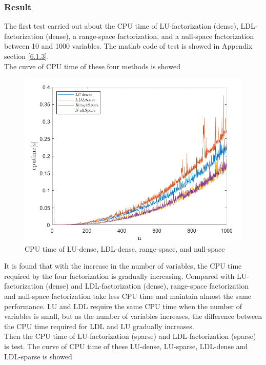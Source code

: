 \subsubsection{\bfseries Result}
The first test carried out about the CPU time of LU-factorization (dense),  LDL-factorization (dense),  a range-space factorization, and a null-space factorization between 10 and 1000 variables. The matlab code of test is showed in Appendix section \ref{6.1.3}.\\
The curve of CPU time of these four methods is showed
\begin{figure}[H]
\centering
\includegraphics[scale=0.7]{figures/EQ_NOSPARSE.PNG}
\caption{CPU time of LU-dense, LDL-dense, range-space, and null-space}
\label{fig:labe1.4.1}
\end{figure}
It is found that with the increase in the number of variables, the CPU time required by the four factorization is gradually increasing. Compared with LU-factorization (dense) and LDL-factorization (dense), range-space factorization and null-space factorization take less CPU time and maintain almost the same performance. LU and LDL require the same CPU time when the number of variables is small, but as the number of variables increases, the difference between the CPU time required for LDL and LU gradually increases.\\
Then the CPU time of LU-factorization (sparse) and LDL-factorization (sparse) is test. The curve of CPU time of these LU-dense, LU-sparse, LDL-dense and LDL-sparse is showed
